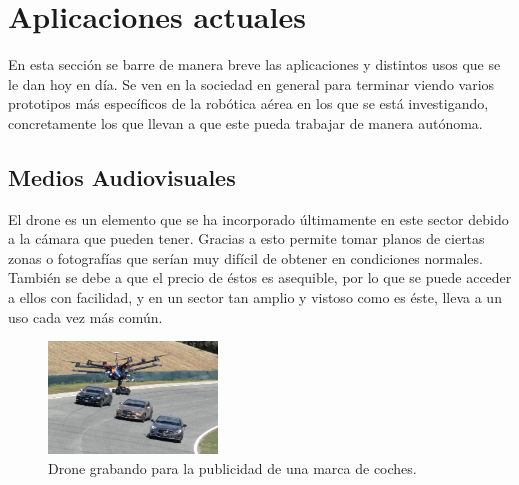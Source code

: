 \section{Aplicaciones actuales }
\hspace{1 cm} En esta secci\'on se barre de manera breve las aplicaciones y distintos usos que se le dan hoy en d\'ia. Se ven en la sociedad en general para terminar viendo varios prototipos m\'as espec\'ificos de la rob\'otica a\'erea en los que se est\'a investigando, concretamente los que llevan a que este pueda trabajar de manera aut\'onoma. 


\subsection{Medios Audiovisuales}
\hspace{1 cm} El drone es un elemento que se ha incorporado \'ultimamente en este sector debido a la c\'amara que pueden tener. Gracias a esto permite tomar planos de ciertas zonas o fotograf\'ias que ser\'ian muy dif\'icil de obtener en condiciones normales. Tambi\'en se debe a que el precio de \'estos es asequible, por lo que se puede acceder a ellos con facilidad, y en un sector tan amplio y vistoso como es \'este, lleva a un uso cada vez m\'as com\'un.
\begin{figure}[H]
	\centering
		\includegraphics[width=0.4\textwidth]{imgs/anuncio_television.jpg}
				\caption{Drone grabando para la publicidad de una marca de coches.}
	\label{fig:Drone grabando publicidad.}
\end{figure}



